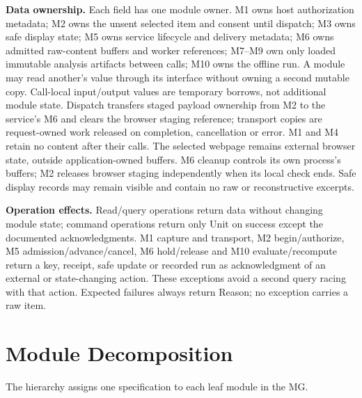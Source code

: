 \documentclass[12pt, titlepage]{article}
\begin{document}
\textbf{Data ownership.} Each field has one module owner. M1 owns host authorization metadata; M2 owns the unsent selected item and consent until dispatch; M3 owns safe display state; M5 owns service lifecycle and delivery metadata; M6 owns admitted raw-content buffers and worker references; M7--M9 own only loaded immutable analysis artifacts between calls; M10 owns the offline run. A module may read another's value through its interface without owning a second mutable copy. Call-local input/output values are temporary borrows, not additional module state. Dispatch transfers staged payload ownership from M2 to the service's M6 and clears the browser staging reference; transport copies are request-owned work released on completion, cancellation or error. M1 and M4 retain no content after their calls. The selected webpage remains external browser state, outside application-owned buffers. M6 cleanup controls its own process's buffers; M2 releases browser staging independently when its local check ends. Safe display records may remain visible and contain no raw or reconstructive excerpts.

\textbf{Operation effects.} Read/query operations return data without changing module state; command operations return only Unit on success except the documented acknowledgments. M1 capture and transport, M2 begin/authorize, M5 admission/advance/cancel, M6 hold/release and M10 evaluate/recompute return a key, receipt, safe update or recorded run as acknowledgment of an external or state-changing action. These exceptions avoid a second query racing with that action. Expected failures always return Reason; no exception carries a raw item.

\section{Module Decomposition}

The hierarchy assigns one specification to each leaf module in the MG.
\end{document}
